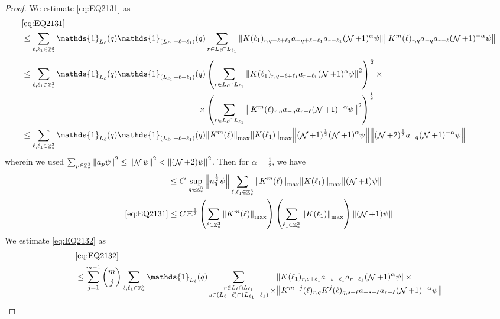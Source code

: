 \documentclass[sn-mathphys, Numbered ,a4paper]{sn-jnl}%
\DeclareMathOperator{\Z}{\mathbb{Z}}
\DeclareMathOperator{\NN}{\mathcal{N}}
\newcommand{\half}{\frac{1}{2}}
\theoremstyle{plain}
\theoremstyle{definition}
\theoremstyle{remark}
\theoremstyle{plain}
\theoremstyle{definition}
\theoremstyle{remark}
\begin{document}
\begin{proof}
We estimate \eqref{eq:EQ2131} as
\begin{alignat}{2}
    &\eqref{eq:EQ2131}\nonumber\\
    &\leq \sum\limits_{\ell, \ell_1\in \Z^3_*} \mathds{1}_{L_{\ell}}(q) \mathds{1}_{(L_{\ell_1}+\ell-\ell_1)}(q) \sum\limits_{r\in L_{\ell} \cap L_{\ell_1}} \norm{ K(\ell_1)_{r,q-\ell+\ell_1} a_{-q+\ell-\ell_1} a_{r-\ell_1}(\NN+1)^{\alpha}\psi}\norm{ K^m(\ell)_{r,q} a_{-q}a_{r-\ell} (\NN+1)^{-\alpha} \psi }\nonumber\\
    &\leq \sum\limits_{\ell, \ell_1\in \Z^3_*} \mathds{1}_{L_{\ell}}(q) \begin{aligned}[t]
     \mathds{1}_{(L_{\ell_1}+\ell-\ell_1)}(q) &\left(\sum\limits_{r\in L_{\ell} \cap L_{\ell_1}} \norm{ K(\ell_1)_{r,q-\ell+\ell_1} a_{r-\ell_1}(\NN+1)^{\alpha} \psi}^2\right)^\half \times\nonumber\\ \times &\left(\sum\limits_{r\in L_{\ell} \cap L_{\ell_1}} \norm{ K^m(\ell)_{r,q} a_{-q}a_{r-\ell} (\NN+1)^{-\alpha} \psi }^2 \right)^\half \end{aligned}\nonumber\\
    &\leq \sum\limits_{\ell, \ell_1\in \Z^3_*} \mathds{1}_{L_{\ell}}(q) \mathds{1}_{(L_{\ell_1}+\ell-\ell_1)}(q)  \norm{K^m(\ell)}_{\mathrm{max}} \norm{ K(\ell_1)}_{\mathrm{max}} \norm{ (\NN+1)^\half(\NN+1)^{\alpha} \psi} \norm{ (\NN+2)^\half a_{-q} (\NN+1)^{-\alpha} \psi }\nonumber
\end{alignat} 
wherein we used $\sum_{p\in \Z^3_*}\norm{a_p \psi}^2\leq\norm{\NN\psi}^2<\norm{(\NN+2)\psi}^2$. Then for $\alpha =  \half $, we have 
\begin{align}
	&\leq C\, \sup\limits_{q\in \Z^3_*}\norm{n_q^\half \psi } \sum\limits_{\ell, \ell_1\in \Z^3_*}   \norm{K^m(\ell)}_{\mathrm{max}} \norm{ K(\ell_1)}_{\mathrm{max}}   \norm{ (\NN+1) \psi} \nonumber\\
	\eqref{eq:EQ2131}&\leq C\, \Xi^\half \left(\sum\limits_{\ell\in \Z^3_*} \norm{K^m(\ell)}_{\mathrm{max}}\right)\left(  \sum\limits_{ \ell_1\in \Z^3_*}  \norm{ K(\ell_1)}_{\mathrm{max}} \right) \norm{ (\NN+1) \psi}\label{eq:estEQ2131} 
\end{align}  
We estimate \eqref{eq:EQ2132} as
\begin{align}
	&\eqref{eq:EQ2132}\nonumber\\
    &\leq \sum\limits_{j=1}^{m-1} {{m}\choose j} \sum\limits_{\ell, \ell_1\in \Z^3_*}\mathds{1}_{L_{\ell}}(q) \sum\limits_{\substack{r\in L_{\ell} \cap L_{\ell_1}\\ s \in (L_{\ell}-\ell) \cap (L_{\ell_1}-\ell_1)}} \begin{aligned}[t] &\norm{ K(\ell_1)_{r,s+\ell_1}a_{-s-\ell_1} a_{r-\ell_1} (\NN+1)^{\alpha}\psi}\nonumber \times \\ \times&\norm{ K^{m-j}(\ell)_{r,q} K^{j}(\ell)_{q,s+\ell} a_{-s-\ell}a_{r-\ell} (\NN+1)^{-\alpha} \psi }\end{aligned} \nonumber\\

\end{align}
\end{proof}
\end{document}

